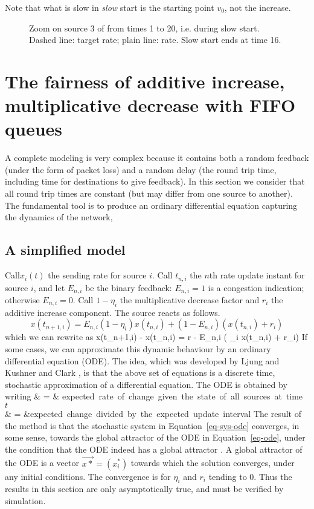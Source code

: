 Note that what is slow in \emph{slow} start is the starting point $v_0$,
not the increase.


\begin{figure}
\caption{Zoom on source 3 of  from times 1 to 20,
i.e. during slow start. Dashed line: target rate; plain line: rate.
Slow start ends at time 16.}\label{fig-ss-1}\end{figure}

\section{The fairness of additive increase, multiplicative
decrease with FIFO queues}

A complete modeling is very complex because it contains both a
random feedback (under the form of packet loss) and a random delay
(the round trip time, including time for destinations to give
feedback).  In this section we consider that all round trip times
are constant (but may differ from one source to another). The
fundamental tool is to produce an ordinary differential equation
capturing the dynamics of the network,

\subsection{A simplified model}
Call$x_i(t)$ the sending rate for source $i$. Call $t_{n,i}$ the
$n$th rate update instant for source $i$, and let $E_{n,i}$ be the
binary feedback: $E_{n,i}=1$ is a congestion indication; otherwise
$E_{n,i}=0$. Call $1-\eta_i$ the multiplicative decrease factor
and $r_i$ the additive increase component. The source reacts as
follows.
$$
x(t_{n+1,i}) = E_{n,i} (1-\eta_i) x(t_{n,i}) + (1 - E_{n,i})
(x(t_{n,i}) + r_i)
$$
which we can rewrite as \be x(t_{n+1,i}) - x(t_{n,i})
= r - E_{n,i} \left( \eta_i x(t_{n,i}) + r_i\right)
 \label{eq-sys-ode}
\ee If some cases, we can approximate this dynamic
behaviour by an ordinary differential equation (ODE).
The idea, which was developed by Ljung \cite{lju77}
and Kushner and Clark \cite{KC78}, is that the above
set of equations is a discrete time, stochastic
approximation of a differential equation. The ODE is
obtained by writing \bear
     & = & \mbox{expected rate of change given the state of all
        sources at time $t$} \\\nonumber
    & = &\mbox{expected change divided by the expected update
    interval} \label{eq-ode}
  \eear
The result of the method is that the stochastic system
in Equation~\ref{eq-sys-ode} converges, in some sense,
towards the global attractor of the ODE in
Equation~\ref{eq-ode}, under the condition that the
ODE indeed has a global attractor \cite{BMP90}. A
global attractor of the ODE is a vector
$\vec{x*}=(x^*_i)$ towards which the solution
converges, under any initial conditions. The
convergence is for $\eta_i$ and $r_i$ tending to $0$.
Thus the results in this section are only
asymptotically true, and must be verified by
simulation.

